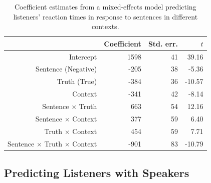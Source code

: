 \documentclass[man, noapacite]{apa2}
\begin{document}
\begin{table}[t]
\caption{\label{tab:listenermodel} Coefficient estimates from a mixed-effects model predicting listeners' reaction times in response to sentences in different contexts.}
\begin{center}
\begin{tabular}{rrrr}
  \hline
 & Coefficient & Std. err. & $t$ \\ 
  \hline
Intercept & 1598 & 41 & 39.16 \\ 
  Sentence (Negative) & -205 & 38 & -5.36  \\ 
  Truth (True) & -384 & 36 & -10.57 \\
  Context & -341 & 42 & -8.14 \\ 
  Sentence $\times$ Truth & 663 & 54 & 12.16 \\
  Sentence $\times$ Context & 377 & 59 & 6.40 \\
  Truth $\times$ Context & 454 & 59 & 7.71 \\
  Sentence $\times$ Truth $\times$ Context & -901 & 83 & -10.79 \\
   \hline
\end{tabular}
\vspace{-1.5cm}
\end{center}
\end{table}


\subsection{Predicting Listeners with Speakers}
\end{document}

